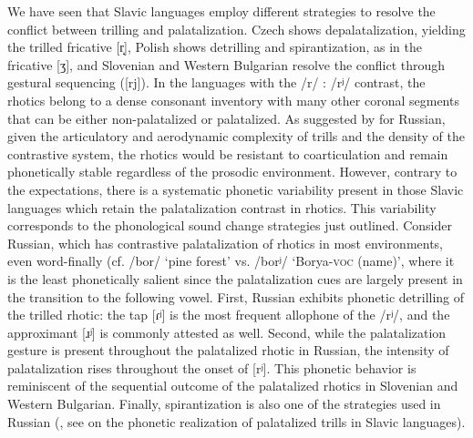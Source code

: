 \documentclass[output=paper]{langscibook}
\begin{document}
We have seen that Slavic languages employ different strategies to resolve the conflict between trilling and palatalization. Czech shows depalatalization, yielding the trilled fricative [r̝], Polish shows detrilling and spirantization, as in the fricative [ʒ], and Slovenian and Western Bulgarian resolve the conflict through gestural sequencing ([rj]). In the languages with the /r/ : /rʲ/ contrast, the rhotics belong to a dense consonant inventory with many other coronal segments that can be either non-palatalized or palatalized. As suggested by \citet{IskarousKavitskaya2010} for Russian, given the articulatory and aerodynamic complexity of trills and the density of the contrastive system, the rhotics would be resistant to coarticulation and remain phonetically stable regardless of the prosodic environment. However, contrary to the expectations, there is a systematic phonetic variability present in those Slavic languages which retain the palatalization contrast in rhotics. This variability corresponds to the phonological sound change strategies just outlined. Consider Russian, which has contrastive palatalization of rhotics in most environments, even word-finally (cf. /bor/ ‘pine forest’ vs. /borʲ/ ‘Borya-\textsc{voc} (name)’, where it is the least phonetically salient since the palatalization cues are largely present in the transition to the following vowel. First, Russian exhibits phonetic detrilling of the trilled rhotic: the tap [ɾʲ] is the most frequent allophone of the /rʲ/, and the approximant [ɹʲ] is commonly attested as well. Second, while the palatalization gesture is present throughout the palatalized rhotic in Russian, the intensity of palatalization rises throughout the onset of [rʲ]. This phonetic behavior is reminiscent of the sequential outcome of the palatalized rhotics in Slovenian and Western Bulgarian. Finally, spirantization is also one of the strategies used in Russian (\citealt{IskarousKavitskaya2010}, see \citealt{Jaworski2018} on the phonetic realization of palatalized trills in Slavic languages).
\end{document}
